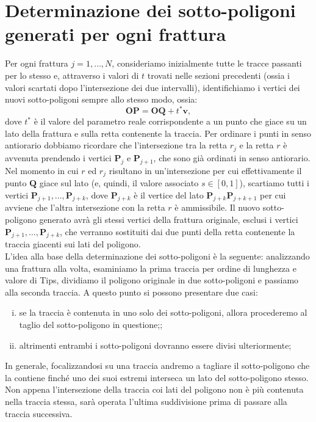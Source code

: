 \documentclass[a4paper]{article}
\newcommand{\B}{\mathbf}
\begin{document}
\section{Determinazione dei sotto-poligoni generati per ogni frattura}
Per ogni frattura $j=1,\dots,N$, consideriamo inizialmente tutte le tracce passanti per lo stesso e, attraverso i valori di $t$ trovati nelle sezioni precedenti (ossia i valori scartati dopo l'intersezione dei due intervalli), identifichiamo i vertici dei nuovi sotto-poligoni sempre allo stesso modo, ossia:$$\B{OP}=\B{OQ}+t^*\B{v},$$ dove $t^*$ è il valore del parametro reale corrispondente a un punto che giace su un lato della frattura e sulla retta contenente la traccia. Per ordinare i punti in senso antiorario dobbiamo ricordare che l'intersezione tra la retta $r_j$ e la retta $r$ è avvenuta prendendo i vertici $\B{P}_j$ e $\B{P}_{j+1}$, che sono già ordinati in senso antiorario. Nel momento in cui $r$ ed $r_j$ risultano in un'intersezione per cui effettivamente il punto $\B{Q}$ giace sul lato (e, quindi, il valore associato $s\in[0,1]$), scartiamo tutti i vertici $\B{P}_{j+1},\dots,\B{P}_{j+k}$, dove $\B{P}_{j+k}$ è il vertice del lato $\B{P}_{j+k}\B{P}_{j+k+1}$ per cui avviene che l'altra intersezione con la retta $r$ è ammissibile. Il nuovo sotto-poligono generato avrà gli stessi vertici della frattura originale, esclusi i vertici $\B{P}_{j+1},\dots,\B{P}_{j+k}$, che verranno sostituiti dai due punti della retta contenente la traccia giacenti sui lati del poligono. 
\\ [2mm]
L'idea alla base della determinazione dei sotto-poligoni è la seguente: analizzando una frattura alla volta, esaminiamo la prima traccia per ordine di lunghezza e valore di Tips, dividiamo il poligono originale in due sotto-poligoni e passiamo alla seconda traccia. A questo punto si possono presentare due casi:
\begin{enumerate} [(i)]
\item  se la traccia è contenuta in uno solo dei sotto-poligoni, allora procederemo al taglio del sotto-poligono in questione;;
\item altrimenti entrambi i sotto-poligoni dovranno essere divisi ulteriormente;
\end{enumerate}

In generale, focalizzandosi su una traccia andremo a tagliare il sotto-poligono che la contiene finché uno dei suoi estremi interseca un lato del sotto-poligono stesso. Non appena l'intersezione della traccia coi lati del poligono non è più contenuta nella traccia stessa, sarà operata l'ultima suddivisione prima di passare alla traccia successiva.\\
\end{document}

